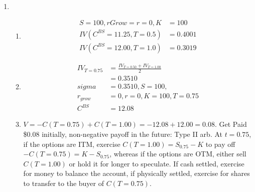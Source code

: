 \documentclass{article}
\begin{document}
\begin{enumerate}
\begin{enumerate}
\end{enumerate}
\item 

\begin{enumerate}
	\item
	$$\begin{aligned}
	S=100, rGrow=r=0, K&=100 \\
	IV(C^{BS}=11.25, T=0.5)&=0.4001 \\
	IV(C^{BS}=12.00, T=1.0)&=0.3019
	\end{aligned}$$
	
	\item
	$$\begin{aligned}
	IV_{T=0.75} &= \frac{IV_{T=0.50}+IV_{T=1.00}}{2} \\
	&= 0.3510 \\
	sigma&=0.3510, S=100, \\
	r_{grow}&=0, r=0, K=100, T=0.75 \\
	C^{BS}&=12.08
	\end{aligned}$$
	
	\item $V = -C(T=0.75)+C(T=1.00) = -12.08 + 12.00 = 0.08$. Get Paid \$0.08 initially, non-negative payoff in the future: Type II arb. At $t=0.75$, if the options are ITM, exercise $C(T=1.00)=S_0.75-K$ to pay off $-C(T=0.75)=K-S_0.75$, whereas if the options are OTM, either sell $C(T=1.00)$ or hold it for longer to speculate. If cash settled, exercise for money to balance the account, if physically settled, exercise for shares to transfer to the buyer of $C(T=0.75)$. 

\end{enumerate}
\end{enumerate}
\end{document}
